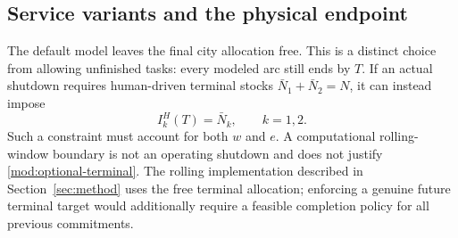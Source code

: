 \subsection{Service variants and the physical endpoint}

The default model leaves the final city allocation free. This is a distinct
choice from allowing unfinished tasks: every modeled arc still ends by
$T$. If an actual shutdown requires human-driven terminal stocks
$\bar N_1+\bar N_2=N$, it can instead impose
\begin{equation}
 I^H_k(T)=\bar N_k,\qquad k=1,2.
 \label{mod:optional-terminal}
\end{equation}
Such a constraint must account for both $w$ and $e$. A computational
rolling-window boundary is not an operating shutdown and does not justify
\eqref{mod:optional-terminal}. The rolling implementation described in
Section~\ref{sec:method}
uses the free terminal allocation; enforcing a genuine future terminal
target would additionally require a feasible completion policy for all
previous commitments.
